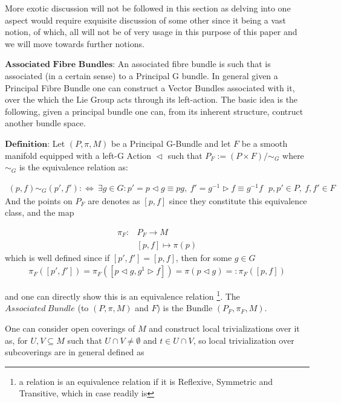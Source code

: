 \documentclass[8pt, twocoloumn]{article}
\begin{document}
More exotic discussion will not be followed in this section as delving into one aspect would require exquisite discussion of some other since it being a vast notion, of which, all will not be of very usage in this purpose of this paper and we will move towards further notions.

$\textbf{Associated Fibre Bundles:}$ An associated fibre bundle is such that is associated (in a certain sense) to a Principal G bundle. In general given a Principal Fibre Bundle one can construct a Vector Bundles associated with it, over the which the Lie Group acts through its left-action. The basic idea is the following, given a principal bundle one can, from its inherent structure, contruct another bundle space. 

$\textbf{Definition:}$ Let $(P, \pi, M)$ be a Principal G-Bundle and let $F$ be a smooth manifold equipped with a left-G Action $\vartriangleleft$ such that
$P_F := (P \times F) / \sim_G$ where $\sim_G$ is the equivalence relation as:

\begin{align}
(p,f) \sim_G (p', f') : \Leftrightarrow \ \exists g\in G : p' = p \vartriangleleft g \equiv pg, \ f' = g^{-1} \vartriangleright f \equiv g^{-1}f \ \ \ p, p' \in P, \ f, f' \in F
\end{align}
And the points on $P_F$ are denotes as $[p,f]$ since they constitute this equivalence class, and 
the map

\begin{align}
\pi_{F}:& P_F \to M \\ 
& [p,f] \mapsto \pi(p)
\end{align}
which is well defined since if $[p', f'] = [p, f]$, then for some $g \in G$
\begin{align}
\pi_F([p', f']) = \pi_F([p \vartriangleleft g, g^{1} \vartriangleright f]) = \pi(p \vartriangleleft  g) =: \pi_{F}([p, f])
\end{align}

and one can directly show this is an equivalence relation \footnote{a relation is an equivalence relation if it is Reflexive, Symmetric and Transitive, which in case readily is}. The $Associated \ Bundle$ (to $(P, \pi, M)$ and $F$) is the Bundle $(P_F, \pi_F, M)$.

One can consider open coverings of $M$ and construct local trivializations over it as, for $U, V \subseteq M$ such that $U \cap V \neq \emptyset$ and $t \in U \cap V$, so local trivialization over subcoverings are in general defined as
\end{document}
